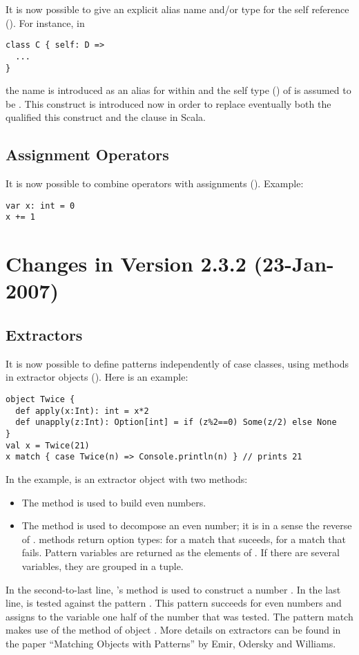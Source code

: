 It is now possible to give an explicit alias name and/or type for the
self reference  (). For instance, in
\begin{lstlisting}
class C { self: D => 
  ...
}
\end{lstlisting}
the name  is introduced as an alias for  within
 and the self type () of  is
assumed to be . This construct is introduced now in order to
replace eventually both the qualified this construct  and
the  clause in Scala.

\subsection*{Assignment Operators}

It is now possible to combine operators with assignments (). Example:
\begin{lstlisting}
var x: int = 0
x += 1
\end{lstlisting}

\section*{Changes in Version 2.3.2 (23-Jan-2007)}

\subsection*{Extractors}

It is now possible to define patterns independently of case classes,
using  methods in extractor objects
(). 
Here is an example:
\begin{lstlisting}
object Twice {                              
  def apply(x:Int): int = x*2
  def unapply(z:Int): Option[int] = if (z%2==0) Some(z/2) else None
}
val x = Twice(21) 
x match { case Twice(n) => Console.println(n) } // prints 21
\end{lstlisting}
In the example, \lstinline@Twice@ is an extractor object with two methods:
\begin{itemize}
\item
The  method is used to build even numbers.
\item
The  method is used to decompose an even number; it is
in a sense the reverse of . \lstinline@unapply@ methods return option types: 
 for a match that suceeds,  for a match that fails.
Pattern variables are returned as the elements of . If there are several
variables, they are grouped in a tuple.
\end{itemize}
In the second-to-last line, 's  method is used
to construct a number . In the last line,  is tested
against the pattern
. This pattern succeeds for even numbers and assigns to the variable
 one half of the number that was tested. The pattern match makes use of
the  method of object . More details on extractors can be found
in the paper ``Matching Objects with Patterns'' by Emir, Odersky and Williams.
 
